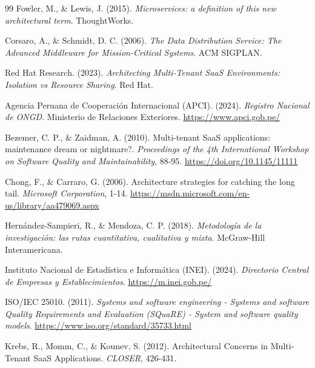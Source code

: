 \documentclass[11pt,a4paper,oneside]{report}
\begin{document}
\renewcommand{\bibname}{Referencias Bibliogr\'aficas}
\begin{thebibliography}{99}
Fowler, M., \& Lewis, J. (2015). \textit{Microservices: a definition of this new architectural term}. ThoughtWorks.

Corsaro, A., \& Schmidt, D. C. (2006). \textit{The Data Distribution Service: The Advanced Middleware for Mission-Critical Systems}. ACM SIGPLAN.

Red Hat Research. (2023). \textit{Architecting Multi-Tenant SaaS Environments: Isolation vs Resource Sharing}. Red Hat.

Agencia Peruana de Cooperaci\'on Internacional (APCI). (2024). \textit{Registro Nacional de ONGD}. Ministerio de Relaciones Exteriores. \url{https://www.apci.gob.pe/}

Bezemer, C. P., \& Zaidman, A. (2010). Multi-tenant SaaS applications: maintenance dream or nightmare?. \textit{Proceedings of the 4th International Workshop on Software Quality and Maintainability}, 88-95. \url{https://doi.org/10.1145/11111}

Chong, F., \& Carraro, G. (2006). Architecture strategies for catching the long tail. \textit{Microsoft Corporation}, 1-14. \url{https://msdn.microsoft.com/en-us/library/aa479069.aspx}

Hern\'andez-Sampieri, R., \& Mendoza, C. P. (2018). \textit{Metodolog\'ia de la investigaci\'on: las rutas cuantitativa, cualitativa y mixta}. McGraw-Hill Interamericana.

Instituto Nacional de Estad\'istica e Inform\'atica (INEI). (2024). \textit{Directorio Central de Empresas y Establecimientos}. \url{https://m.inei.gob.pe/}

ISO/IEC 25010. (2011). \textit{Systems and software engineering - Systems and software Quality Requirements and Evaluation (SQuaRE) - System and software quality models}. \url{https://www.iso.org/standard/35733.html}

Krebs, R., Momm, C., \& Kounev, S. (2012). Architectural Concerns in Multi-Tenant SaaS Applications. \textit{CLOSER}, 426-431.


\end{thebibliography}
\end{document}
